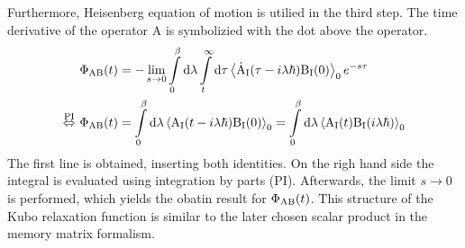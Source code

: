 Furthermore, Heisenberg equation of motion is utilied in the third step.
The time derivative of the operator A is symbolizied with the dot above the operator.
%
\begin{align}
	&\Phi_{\mathrm{AB}}(t) = -\lim\limits_{s \to 0} \int\limits_{0}^{\beta} \dd{\lambda} \int\limits_{t}^{\infty} \dd{\tau} \expval{\dot{\mathrm{A}}_{\mathrm{I}}(\tau-i\lambda\hbar) \mathrm{B}_{\mathrm{I}}(0)}_{0} e^{-s\tau}
	\notag \\
	\overset{\mathrm{PI}}{\Leftrightarrow}\ &\Phi_{\mathrm{AB}}(t) = \int\limits_{0}^{\beta} \dd{\lambda} \expval{\mathrm{A}_{\mathrm{I}}(t-i\lambda\hbar) \mathrm{B}_{\mathrm{I}}(0)}_{0} = \int\limits_{0}^{\beta} \dd{\lambda} \expval{\mathrm{A}_{\mathrm{I}}(t) \mathrm{B}_{\mathrm{I}}(i\lambda\hbar)}_{0}
	\label{eq:Kubo relaxation function 2.0}
\end{align}
%
The first line is obtained, inserting both identities.
On the righ hand side the integral is evaluated using integration by parts (PI).
Afterwards, the limit $s\to 0$ is performed, which yields the obatin result for $\Phi_{\mathrm{AB}}(t)$.
This structure of the Kubo relaxation function is similar to the later chosen scalar product in the memory matrix formalism.


%
%
